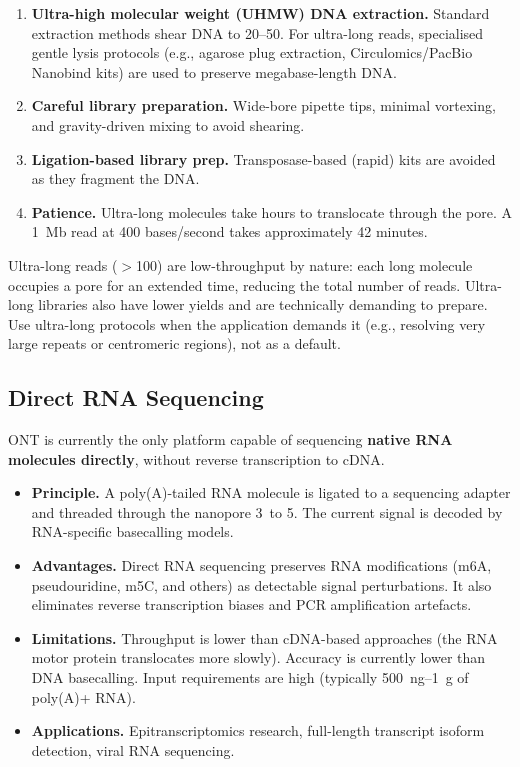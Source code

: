 \begin{enumerate}[nosep]
  \item \textbf{Ultra-high molecular weight (UHMW) DNA extraction.} Standard extraction methods shear DNA to 20--50\kilobase. For ultra-long reads, specialised gentle lysis protocols (e.g., agarose plug extraction, Circulomics/PacBio Nanobind kits) are used to preserve megabase-length DNA.
  \item \textbf{Careful library preparation.} Wide-bore pipette tips, minimal vortexing, and gravity-driven mixing to avoid shearing.
  \item \textbf{Ligation-based library prep.} Transposase-based (rapid) kits are avoided as they fragment the DNA.
  \item \textbf{Patience.} Ultra-long molecules take hours to translocate through the pore. A 1~Mb read at 400 bases/second takes approximately 42 minutes.
\end{enumerate}

\begin{warningbox}[title={Ultra-Long Read Caveats}]
Ultra-long reads ($>$100\kilobase) are low-throughput by nature: each long molecule occupies a pore for an extended time, reducing the total number of reads. Ultra-long libraries also have lower yields and are technically demanding to prepare. Use ultra-long protocols when the application demands it (e.g., resolving very large repeats or centromeric regions), not as a default.
\end{warningbox}

\subsection{Direct RNA Sequencing}

ONT is currently the only platform capable of sequencing \textbf{native RNA molecules directly}, without reverse transcription to cDNA.

\begin{itemize}
  \item \textbf{Principle.} A poly(A)-tailed RNA molecule is ligated to a sequencing adapter and threaded through the nanopore 3\textquotesingle\ to 5\textquotesingle. The current signal is decoded by RNA-specific basecalling models.

  \item \textbf{Advantages.} Direct RNA sequencing preserves RNA modifications (m6A, pseudouridine, m5C, and others) as detectable signal perturbations. It also eliminates reverse transcription biases and PCR amplification artefacts.

  \item \textbf{Limitations.} Throughput is lower than cDNA-based approaches (the RNA motor protein translocates more slowly). Accuracy is currently lower than DNA basecalling. Input requirements are high (typically 500~ng--1~\textmu g of poly(A)+ RNA).

  \item \textbf{Applications.} Epitranscriptomics research, full-length transcript isoform detection, viral RNA sequencing.
\end{itemize}

